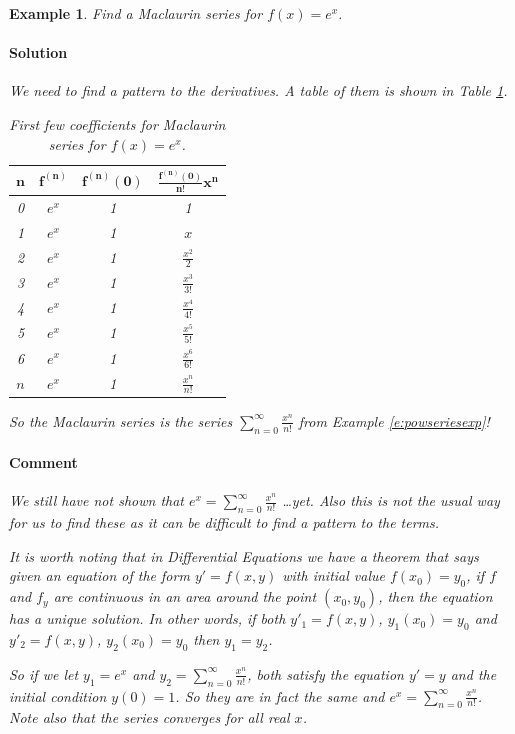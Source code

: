 \documentclass[letterpaper, 11pt, openany]{book}
\theoremstyle{mytheoremstyle}
\theoremstyle{myexamplestyle}
\newtheorem{example}{Example}[section]
\newenvironment{solution}{\paragraph{\sffamily \smaller \fontseries{b}\selectfont Solution}}{\hfill\faSquare}
\newenvironment{commentary}{\paragraph{\sffamily \smaller \fontseries{b}\selectfont Comment}}{}
\begin{document}
\begin{example}\label{e:Taylorseriesexp}
    Find a Maclaurin series for $f(x) = e^{x}$.
    \begin{solution}
        We need to find a pattern to the derivatives. A table of them is shown in Table \ref{t:MaclaurinExp}.
        \begin{table}[htbp]\label{t:MaclaurinExp}
            \centering
            \caption{First few coefficients for Maclaurin series for $f(x) = e^{x}$.}
            \begin{tabular}{cccc}
                $\bm{n}$    & $\bm{f^{(n)}}$    & $\bm{f^{(n)}(0)}$ & $\bm{\frac{f^{(n)}(0)}{n!} x^{n}}$ \\ \hline
                0           & $e^{x}$           & 1                 & 1 \\[6pt]
                1           & $e^{x}$           & 1                 & $x$ \\[6pt]
                2           & $e^{x}$           & 1                 & $\frac{x^{2}}{2}$ \\[6pt]
                3           & $e^{x}$           & 1                 & $\frac{x^{3}}{3!}$ \\[6pt]
                4           & $e^{x}$           & 1                 & $\frac{x^{4}}{4!}$ \\[6pt]
                5           & $e^{x}$           & 1                 & $\frac{x^{5}}{5!}$ \\[6pt]
                6           & $e^{x}$           & 1                 & $\frac{x^{6}}{6!}$ \\[6pt]
                $n$         & $e^{x}$           & 1                 & $\frac{x^{n}}{n!}$ \\[6pt]
                \hline
            \end{tabular}
        \end{table}
    So the Maclaurin series is the series $\displaystyle \sum_{n=0}^{\infty} \frac{x^{n}}{n!}$ from Example \ref{e:powseriesexp}!
    \end{solution}
    \begin{commentary}
        We still have not shown that $\displaystyle e^{x} = \sum_{n=0}^{\infty} \frac{x^{n}}{n!}$ \ldots yet. Also this is not the usual way for us to find these as it can be difficult to find a pattern to the terms.

        It is worth noting that in Differential Equations we have a theorem that says given an equation of the form $y' = f(x,y)$ with initial value $f(x_{0}) = y_{0}$, if $f$ and $f_{y}$ are continuous in an area around the point $(x_{0}, y_{0})$, then the equation has a unique solution. In other words, if both $y'_{1} = f(x,y)$, $y_{1}(x_{0}) = y_{0}$ and $y'_{2} = f(x,y)$, $y_{2}(x_{0}) = y_{0}$ then $y_{1} = y_{2}$.

        So if we let $y_{1} = e^{x}$ and $\displaystyle y_{2} = \sum_{n=0}^{\infty} \frac{x^{n}}{n!}$, both satisfy the equation $y' = y$ and the initial condition $y(0)=1$. So they are in fact the same and $\displaystyle e^{x} = \sum_{n=0}^{\infty} \frac{x^{n}}{n!}$. Note also that the series converges for all real $x$.
    \end{commentary}
\end{example}
\end{document}
